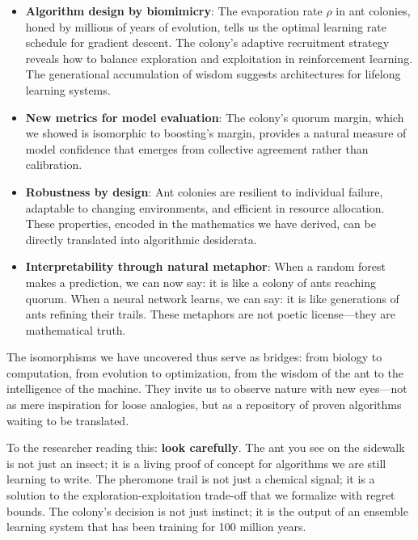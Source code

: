 \documentclass[12pt,letterpaper]{article}
\begin{document}
\begin{itemize}
    \item \textbf{Algorithm design by biomimicry}: The evaporation rate $\rho$ in ant colonies, honed by millions of years of evolution, tells us the optimal learning rate schedule for gradient descent. The colony's adaptive recruitment strategy reveals how to balance exploration and exploitation in reinforcement learning. The generational accumulation of wisdom suggests architectures for lifelong learning systems.
    
    \item \textbf{New metrics for model evaluation}: The colony's quorum margin, which we showed is isomorphic to boosting's margin, provides a natural measure of model confidence that emerges from collective agreement rather than calibration.
    
    \item \textbf{Robustness by design}: Ant colonies are resilient to individual failure, adaptable to changing environments, and efficient in resource allocation. These properties, encoded in the mathematics we have derived, can be directly translated into algorithmic desiderata.
    
    \item \textbf{Interpretability through natural metaphor}: When a random forest makes a prediction, we can now say: it is like a colony of ants reaching quorum. When a neural network learns, we can say: it is like generations of ants refining their trails. These metaphors are not poetic license—they are mathematical truth.
\end{itemize}

The isomorphisms we have uncovered thus serve as bridges: from biology to computation, from evolution to optimization, from the wisdom of the ant to the intelligence of the machine. They invite us to observe nature with new eyes—not as mere inspiration for loose analogies, but as a repository of proven algorithms waiting to be translated.

To the researcher reading this: \textbf{look carefully}. The ant you see on the sidewalk is not just an insect; it is a living proof of concept for algorithms we are still learning to write. The pheromone trail is not just a chemical signal; it is a solution to the exploration-exploitation trade-off that we formalize with regret bounds. The colony's decision is not just instinct; it is the output of an ensemble learning system that has been training for 100 million years.
\end{document}
